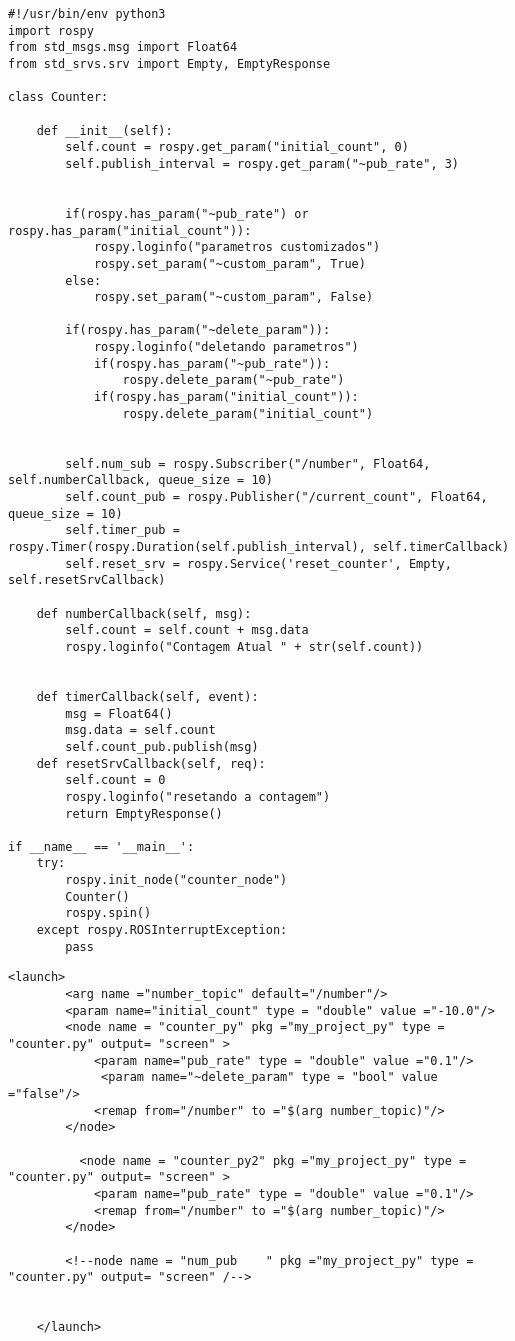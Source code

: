 \documentclass[letterpaper]{article}
\begin{document}
\begin{lstlisting}[style=pythonstyle, title=counter.py] 
#!/usr/bin/env python3
import rospy
from std_msgs.msg import Float64
from std_srvs.srv import Empty, EmptyResponse

class Counter:

    def __init__(self):
        self.count = rospy.get_param("initial_count", 0)
        self.publish_interval = rospy.get_param("~pub_rate", 3)
        
        
        if(rospy.has_param("~pub_rate") or rospy.has_param("initial_count")):
            rospy.loginfo("parametros customizados")
            rospy.set_param("~custom_param", True)
        else:
            rospy.set_param("~custom_param", False)
            
        if(rospy.has_param("~delete_param")):
            rospy.loginfo("deletando parametros")   
            if(rospy.has_param("~pub_rate")):
                rospy.delete_param("~pub_rate") 
            if(rospy.has_param("initial_count")):
                rospy.delete_param("initial_count")     
            
       
        self.num_sub = rospy.Subscriber("/number", Float64, self.numberCallback, queue_size = 10)
        self.count_pub = rospy.Publisher("/current_count", Float64, queue_size = 10)
        self.timer_pub = rospy.Timer(rospy.Duration(self.publish_interval), self.timerCallback)
        self.reset_srv = rospy.Service('reset_counter', Empty, self.resetSrvCallback)
        
    def numberCallback(self, msg):
        self.count = self.count + msg.data
        rospy.loginfo("Contagem Atual " + str(self.count))


    def timerCallback(self, event):
        msg = Float64()
        msg.data = self.count
        self.count_pub.publish(msg)
    def resetSrvCallback(self, req):
        self.count = 0 
        rospy.loginfo("resetando a contagem")
        return EmptyResponse()

if __name__ == '__main__':
    try:
        rospy.init_node("counter_node")
        Counter()
        rospy.spin()
    except rospy.ROSInterruptException:
        pass
\end{lstlisting}
\begin{lstlisting}[style=xmlstyle, title=counter\_py.launch]
    <launch>
        <arg name ="number_topic" default="/number"/>
        <param name="initial_count" type = "double" value ="-10.0"/>
        <node name = "counter_py" pkg ="my_project_py" type = "counter.py" output= "screen" >
            <param name="pub_rate" type = "double" value ="0.1"/>
             <param name="~delete_param" type = "bool" value ="false"/>
            <remap from="/number" to ="$(arg number_topic)"/>
        </node>

          <node name = "counter_py2" pkg ="my_project_py" type = "counter.py" output= "screen" >
            <param name="pub_rate" type = "double" value ="0.1"/>
            <remap from="/number" to ="$(arg number_topic)"/>
        </node>
        
        <!--node name = "num_pub    " pkg ="my_project_py" type = "counter.py" output= "screen" /-->


    </launch>
\end{lstlisting}
\end{document}
